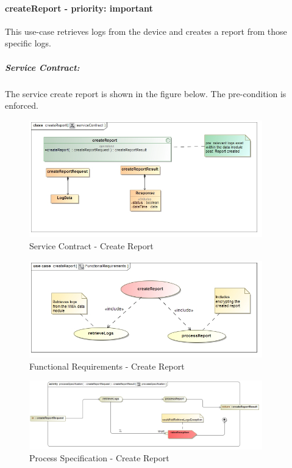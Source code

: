 \documentclass[hidelinks, 12pt, oneside]{article}
\begin{document}
		\paragraph{ createReport - priority: important}
		This use-case retrieves logs from the device and creates a report from those specific logs.
		\newpage
		
		\subparagraph{Service Contract:}
					The service create report is shown in the figure below. The pre-condition is enforced. 
					
				
		\begin{figure}[!htbp]
    		\centering
    		\includegraphics[width=0.9\textwidth]{img/serviceContractcreateReport.jpg}
    		\caption{Service Contract - Create Report}
    		\label{fig:ServiceCon_createReport}
		\end{figure}
		
		
		\begin{figure}[!htbp]
    		\centering
    		\includegraphics[width=0.9\textwidth]{img/FunctionalRequirementscreateReport.jpg}
    		\caption{Functional Requirements - Create Report}
    		\label{fig:FunctionalReq_createReport}
		\end{figure}
		
		
		\begin{figure}[!htbp]
    		\centering
    		\includegraphics[width=0.9\textwidth]{img/processSpecificationcreateReport.jpg}
    		\caption{Process Specification - Create Report}
    		\label{fig:ProcessSpec_createReport}
		\end{figure}
		\newpage			
					
\end{document}
